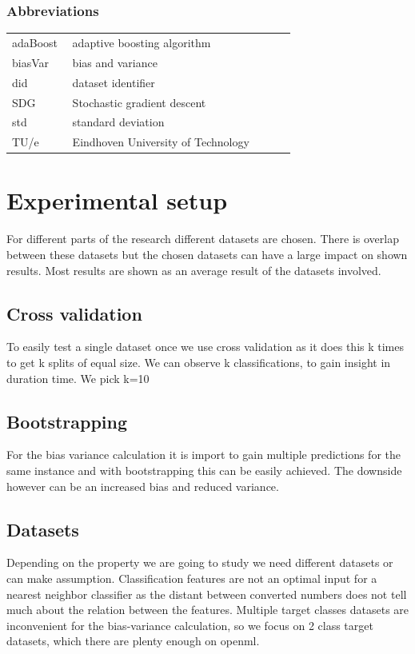 \documentclass[a4paper,10pt]{article}
\begin{document}
\subsubsection{Abbreviations}
\begin{tabular}{ p{0.20\linewidth} p{0.7437\linewidth} }
	
	adaBoost & adaptive boosting algorithm \\
	
	biasVar & bias and variance \\
	
	did & dataset identifier \\
	
	SDG & Stochastic gradient descent \\
	
	std & standard deviation\\
	
	TU/e & Eindhoven University of Technology \\
	
	
\end{tabular}

\newpage
\section{Experimental setup} \label{Chapter3}
For different parts of the research different datasets are chosen. There is overlap between these datasets but the chosen datasets can have a large impact on shown results. Most results are shown as an average result of the datasets involved.
\subsection{Cross validation} \label{cross-val}
To easily test a single dataset once we use cross validation as it does this k times to get k splits of equal size. We can observe k classifications, to gain insight in duration time. We pick k=10 

\subsection{Bootstrapping} \label{motivation}
For the bias variance calculation it is import to gain multiple predictions for the same instance and with bootstrapping this can be easily achieved. The downside however can be an increased bias and reduced variance.

\subsection{Datasets} \label{description}
Depending on the property we are going to study we need different datasets or can make assumption. Classification features are not an optimal input for a nearest neighbor classifier as the distant between converted numbers does not tell much about the relation between the features. Multiple target classes datasets are inconvenient for the bias-variance calculation, so we focus on 2 class target datasets, which there are plenty enough on openml. 
\end{document}
